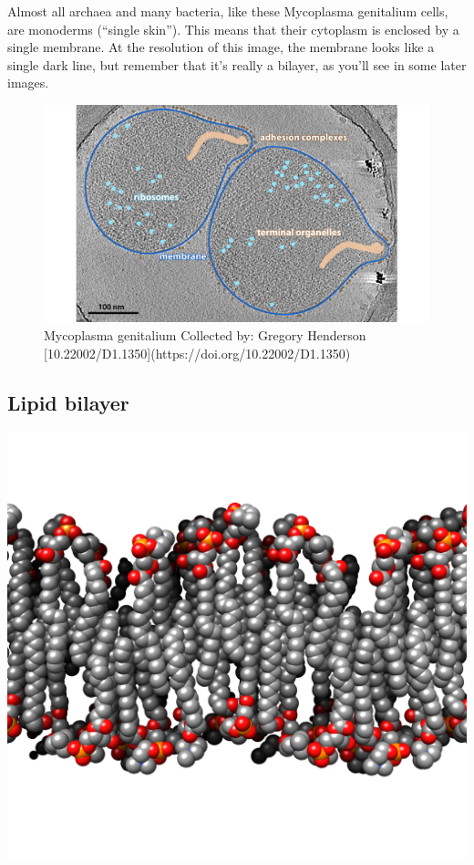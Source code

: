 \documentclass[]{tufte-book}
\begin{document}
Almost all archaea and many bacteria, like these Mycoplasma genitalium
cells, are monoderms (``single skin''). This means that their cytoplasm
is enclosed by a single membrane. At the resolution of this image, the
membrane looks like a single dark line, but remember that it's really a
bilayer, as you'll see in some later images.

\begin{figure}
\includegraphics{img/2_1_Mgenitalium} \caption[Mycoplasma genitalium Collected by]{Mycoplasma genitalium Collected by: Gregory Henderson [10.22002/D1.1350](https://doi.org/10.22002/D1.1350)}\label{fig:unnamed-chunk-1}
\end{figure}

\hypertarget{Lipid_bilayer}{\subsection{Lipid
bilayer}\label{Lipid_bilayer}}

\includegraphics{img/02_schematic/2_1_1_LipidBilayer}
\end{document}
